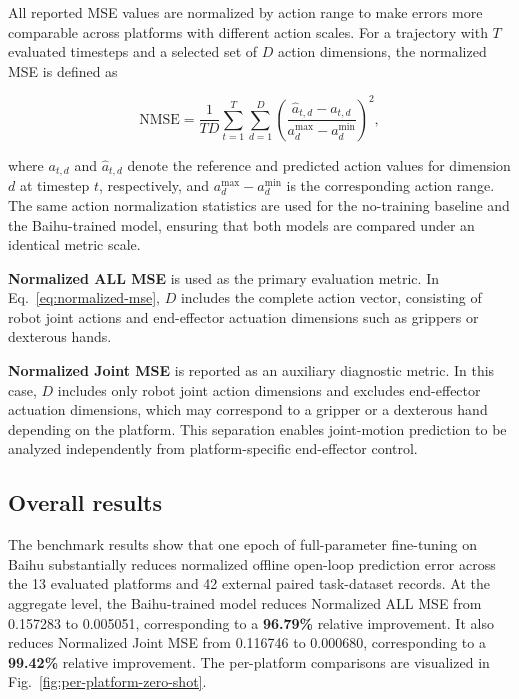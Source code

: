All reported MSE values are normalized by action range to make errors more comparable across platforms with different action scales. For a trajectory with $T$ evaluated timesteps and a selected set of $D$ action dimensions, the normalized MSE is defined as

\begin{equation}
\mathrm{NMSE}
=
\frac{1}{TD}
\sum_{t=1}^{T}
\sum_{d=1}^{D}
\left(
\frac{\hat{a}_{t,d}-a_{t,d}}
{a_{d}^{\max}-a_{d}^{\min}}
\right)^{2},
\label{eq:normalized-mse}
\end{equation}

where $a_{t,d}$ and $\hat{a}_{t,d}$ denote the reference and predicted action values for dimension $d$ at timestep $t$, respectively, and $a_{d}^{\max}-a_{d}^{\min}$ is the corresponding action range. The same action normalization statistics are used for the no-training baseline and the Baihu-trained model, ensuring that both models are compared under an identical metric scale.

\textbf{Normalized ALL MSE} is used as the primary evaluation metric. In Eq.~\ref{eq:normalized-mse}, $D$ includes the complete action vector, consisting of robot joint actions and end-effector actuation dimensions such as grippers or dexterous hands.

\textbf{Normalized Joint MSE} is reported as an auxiliary diagnostic metric. In this case, $D$ includes only robot joint action dimensions and excludes end-effector actuation dimensions, which may correspond to a gripper or a dexterous hand depending on the platform. This separation enables joint-motion prediction to be analyzed independently from platform-specific end-effector control.

\subsection{Overall results}

The benchmark results show that one epoch of full-parameter fine-tuning on Baihu substantially reduces normalized offline open-loop prediction error across the 13 evaluated platforms and 42 external paired task-dataset records. At the aggregate level, the Baihu-trained model reduces Normalized ALL MSE from 0.157283 to 0.005051, corresponding to a \textbf{96.79\%} relative improvement. It also reduces Normalized Joint MSE from 0.116746 to 0.000680, corresponding to a \textbf{99.42\%} relative improvement. The per-platform comparisons are visualized in Fig.~\ref{fig:per-platform-zero-shot}.

